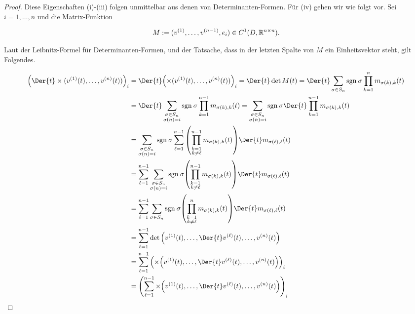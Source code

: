 \begin{proof}

Diese Eigenschaften (i)-(iii) folgen unmittelbar aus denen von Determinanten-Formen.
Für (iv) gehen wir wie folgt vor.
Sei $i = 1, \ldots, n$ und die Matrix-Funktion

\begin{align*}
  M := (v^{(1)}, \ldots, v^{(n-1)}, e_i)
  \in C^1(D, \mathbb{R}^{n \times n}).
\end{align*}

Laut der Leibnitz-Formel für Determinanten-Formen, und der Tatsache, dass in der letzten Spalte von $M$ ein Einheitsvektor steht, gilt Folgendes.

\begin{align*}
  \pbraces
  {
    \Der{t}
    \times(v^{(1)}(t), \ldots, v^{(n)}(t))
  }_i
  & =
  \Der{t}
  \pbraces
  {
    \times(v^{(1)}(t), \ldots, v^{(n)}(t))
  }_i
  =
  \Der{t}
  \det{M(t)}
  =
  \Der{t}
  \sum_{\sigma \in S_n}
  \sgn{\sigma}
  \prod_{k=1}^n
  m_{\sigma(k), k}(t) \\
  & =
  \Der{t}
  \sum_{\substack{\sigma \in S_n \\ \sigma(n) = i}}
  \sgn{\sigma}
  \prod_{k=1}^{n-1}
  m_{\sigma(k), k}(t)
  =
  \sum_{\substack{\sigma \in S_n \\ \sigma(n) = i}}
  \sgn{\sigma}
  \Der{t}
  \prod_{k=1}^{n-1}
  m_{\sigma(k), k}(t) \\
  & =
  \sum_{\substack{\sigma \in S_n \\ \sigma(n) = i}}
  \sgn{\sigma}
  \sum_{\ell = 1}^{n-1}
  \pbraces
  {
    \prod_{\substack{k=1 \\ k \neq \ell}}^{n-1}
    m_{\sigma(k), k}(t)
  }
  \Der{t}
  m_{\sigma(\ell), \ell}(t) \\
  & =
  \sum_{\ell = 1}^{n-1}
  \sum_{\substack{\sigma \in S_n \\ \sigma(n) = i}}
  \sgn{\sigma}
  \pbraces
  {
    \prod_{\substack{k=1 \\ k \neq \ell}}^{n-1}
    m_{\sigma(k), k}(t)
  }
  \Der{t}
  m_{\sigma(\ell), \ell}(t) \\
  & =
  \sum_{\ell = 1}^{n-1}
  \sum_{\sigma \in S_n}
  \sgn{\sigma}
  \pbraces
  {
    \prod_{\substack{k=1 \\ k \neq \ell}}^n
    m_{\sigma(k), k}(t)
  }
  \Der{t}
  m_{\sigma(\ell), \ell}(t) \\
  & =
  \sum_{\ell = 1}^{n-1}
  \det \pbraces
  {
    v^{(1)}(t),
    \ldots,
    \Der{t}
    v^{(\ell)}(t),
    \ldots,
    v^{(n)}(t)
  } \\
  & =
  \sum_{\ell = 1}^{n-1}
  \pbraces
  {
    \times \pbraces
    {
    v^{(1)}(t),
    \ldots,
    \Der{t}
    v^{(\ell)}(t),
    \ldots,
    v^{(n)}(t)
    }
  }_i \\
  & =
  \pbraces
  {
    \sum_{\ell = 1}^{n-1}
    \times \pbraces
    {
    v^{(1)}(t),
    \ldots,
    \Der{t}
    v^{(\ell)}(t),
    \ldots,
    v^{(n)}(t)
    }
  }_i
\end{align*}

\end{proof}
